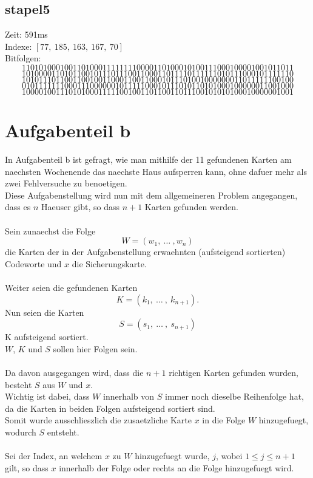 \documentclass[a4paper,10pt,ngerman]{scrartcl}
\begin{document}
{\subsection{stapel5}
Zeit: 591ms \\
Indexe: $[77, \ 185, \ 163, \ 167, \ 70]$ \\
Bitfolgen:
$$
1101010001001101000111111110000110100010100111000100001001011011
$$
$$
1010000110101100101110111001100011011110111111010111000101111110
$$
$$
1010111011001100100110001100110001011101001000000011011111100100
$$
$$
0101111111000111000000101111100010111010110101000100000011001000
$$
$$
1000010011101010001111100100110110011011100101010100010000001001
$$

\section{Aufgabenteil b}
In Aufgabenteil b ist gefragt, wie man mithilfe der 11 gefundenen Karten am naechsten Wochenende das naechste Haus aufsperren kann, ohne dafuer mehr als zwei Fehlversuche zu benoetigen.\\
Diese Aufgabenstellung wird nun mit dem allgemeineren  Problem angegangen, dass es $n$ Haeuser gibt, so dass $n+1$ Karten gefunden werden.
\\\\
Sein zunaechst die Folge 
$$
W = (w_1, \ \dots \ , w_n)
$$
die Karten der in der Aufgabenstellung erwaehnten (aufsteigend sortierten) Codeworte und $x$ die Sicherungskarte.\\
\\
Weiter seien die gefundenen Karten
$$K = (k_1, \ \dots \ , \ k_{n+1}). $$
Nun seien die Karten 
$$S = (s_1, \ \dots \ , \ s_{n+1}) $$
K aufsteigend sortiert.\\
$W$, $K$ und $S$ sollen hier Folgen sein.
\\\\
Da davon ausgegangen wird, dass die $n+1$ richtigen Karten gefunden wurden, besteht $S$ aus $W$ und $x$.
\\
Wichtig ist dabei, dass $W$ innerhalb von $S$ immer noch dieselbe Reihenfolge hat, da die Karten in beiden Folgen aufsteigend sortiert sind.\\
Somit wurde ausschlieszlich die zusaetzliche Karte $x$ in die Folge $W$ hinzugefuegt, wodurch $S$ entsteht.
\\\\
Sei der Index, an welchem $x$ zu $W$ hinzugefuegt wurde, $j$, wobei $1 \leq j \leq n+1$ gilt, so dass $x$ innerhalb der Folge oder rechts an die Folge hinzugefuegt wird.
}
\end{document}

